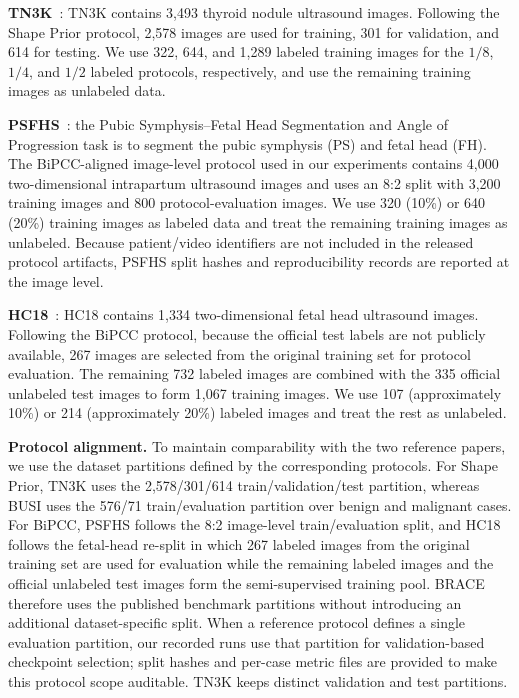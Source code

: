\documentclass[a4paper,fleqn]{cas-dc}
\begin{document}
\textbf{TN3K}~\cite{b4}: TN3K contains 3,493 thyroid nodule ultrasound images. Following the Shape Prior protocol, 2,578 images are used for training, 301 for validation, and 614 for testing. We use 322, 644, and 1,289 labeled training images for the $1/8$, $1/4$, and $1/2$ labeled protocols, respectively, and use the remaining training images as unlabeled data.

\textbf{PSFHS}~\cite{b53}: the Pubic Symphysis--Fetal Head Segmentation and Angle of Progression task is to segment the pubic symphysis (PS) and fetal head (FH). The BiPCC-aligned image-level protocol used in our experiments contains 4,000 two-dimensional intrapartum ultrasound images and uses an 8:2 split with 3,200 training images and 800 protocol-evaluation images. We use 320 (10\%) or 640 (20\%) training images as labeled data and treat the remaining training images as unlabeled. Because patient/video identifiers are not included in the released protocol artifacts, PSFHS split hashes and reproducibility records are reported at the image level.

\textbf{HC18}~\cite{b54}: HC18 contains 1,334 two-dimensional fetal head ultrasound images. Following the BiPCC protocol, because the official test labels are not publicly available, 267 images are selected from the original training set for protocol evaluation. The remaining 732 labeled images are combined with the 335 official unlabeled test images to form 1,067 training images. We use 107 (approximately 10\%) or 214 (approximately 20\%) labeled images and treat the rest as unlabeled.

\textbf{Protocol alignment.} To maintain comparability with the two reference papers, we use the dataset partitions defined by the corresponding protocols. For Shape Prior, TN3K uses the 2,578/301/614 train/validation/test partition, whereas BUSI uses the 576/71 train/evaluation partition over benign and malignant cases. For BiPCC, PSFHS follows the 8:2 image-level train/evaluation split, and HC18 follows the fetal-head re-split in which 267 labeled images from the original training set are used for evaluation while the remaining labeled images and the official unlabeled test images form the semi-supervised training pool. BRACE therefore uses the published benchmark partitions without introducing an additional dataset-specific split. When a reference protocol defines a single evaluation partition, our recorded runs use that partition for validation-based checkpoint selection; split hashes and per-case metric files are provided to make this protocol scope auditable. TN3K keeps distinct validation and test partitions.
\end{document}

